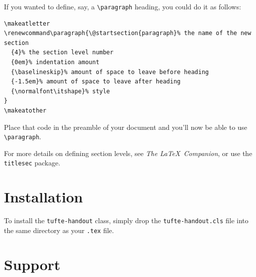 \documentclass{tufte-handout}
\begin{document}
If you wanted to define, say, a \Verb|\paragraph| heading, you could do it
as follows:

\begin{Verbatim}
\makeatletter
\renewcommand\paragraph{\@startsection{paragraph}% the name of the new section
  {4}% the section level number
  {0em}% indentation amount
  {\baselineskip}% amount of space to leave before heading
  {-1.5em}% amount of space to leave after heading
  {\normalfont\itshape}% style
}
\makeatother
\end{Verbatim}

Place that code in the preamble of your document and you'll now be able to use
\Verb|\paragraph|.  

For more details on defining section levels, see \textit{The \LaTeX\
Companion},\cite{Mittelbach2004} or use the \Verb|titlesec| package.


\section{Installation}\label{sec:installation}
To install the \Verb|tufte-handout| class, simply drop the
\Verb|tufte-handout.cls| file into the same directory as your \Verb|.tex|
file.



\section{Support}\label{sec:support}
\end{document}
